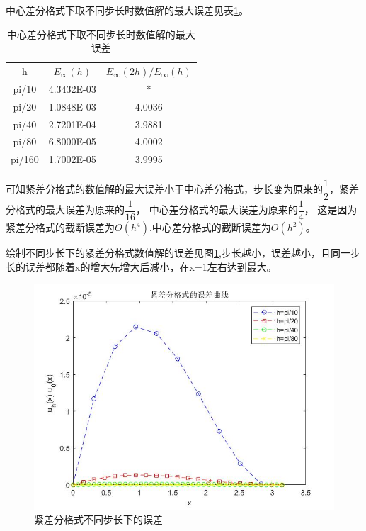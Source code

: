 \documentclass[withoutpreface,bwprint]{cumcmthesis} %
\begin{document}
	中心差分格式下取不同步长时数值解的最大误差见表\ref{tab:4}。
	\begin{table}[htbp]
		\centering
		\caption{中心差分格式下取不同步长时数值解的最大误差}
		\begin{tabular}{ccc}
			\toprule[1.5pt]
			\multicolumn{1}{c}{\multirow{2}[0]{*}{h}} & \multicolumn{1}{c}{\multirow{2}[0]{*}{$E_{\infty}(h)$}} & \multicolumn{1}{c}{\multirow{2}[0]{*}{$E_{\infty}(2h)/E_{\infty}(h)$}} \\
			&       &  \\
			\midrule[1pt]
			pi/10 & 4.3432E-03 & \multicolumn{1}{c}{*} \\
			pi/20 & 1.0848E-03 & 4.0036  \\
			pi/40 & 2.7201E-04 & 3.9881  \\
			pi/80 & 6.8000E-05 & 4.0002  \\
			pi/160 & 1.7002E-05 & 3.9995  \\
			\bottomrule[1.5pt]
		\end{tabular}%
		\label{tab:4}%
	\end{table}%
	
	可知紧差分格式的数值解的最大误差小于中心差分格式，步长变为原来的$ \dfrac{1}{2} $，紧差分格式的最大误差为原来的$ \dfrac{1}{16} $，
	中心差分格式的最大误差为原来的$ \dfrac{1}{4} $，
	这是因为紧差分格式的截断误差为$ O(h^{4}) $,中心差分格式的截断误差为$ O(h^{2})$。
	
	绘制不同步长下的紧差分格式数值解的误差见图\ref{fig:wucha},步长越小，误差越小，且同一步长的误差都随着x的增大先增大后减小，在x=1左右达到最大。
	\begin{figure}
		\centering
		\includegraphics[width=0.7\linewidth]{figures/wucha}
		\caption{紧差分格式不同步长下的误差}
		\label{fig:wucha}
	\end{figure}
\end{document}
